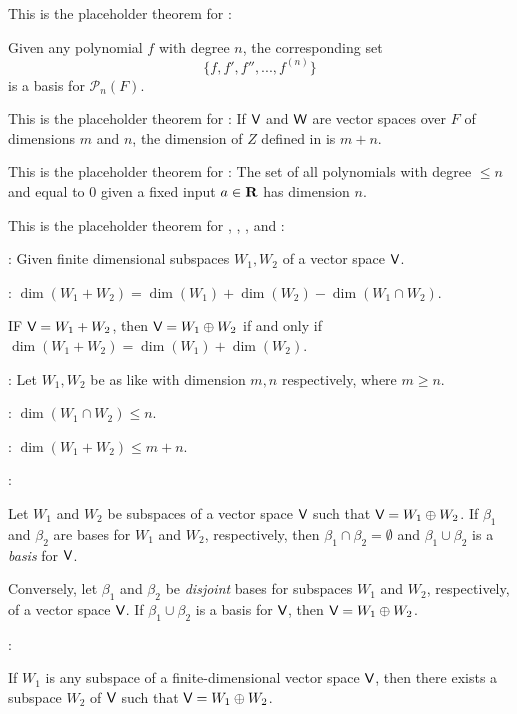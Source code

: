 \begin{additional theorem} \label{athm 1.24}
This is the placeholder theorem for :

Given any polynomial \(f\) with degree \(n\), the corresponding set
\[
    \{ f, f', f'', ..., f^{(n)} \}
\]
is a basis for \(\mathcal{P}_n(F)\).
\end{additional theorem}

\begin{additional theorem} \label{athm 1.25}
This is the placeholder theorem for :
If \(\textsf{V}\) and \(\textsf{W}\) are vector spaces over \(F\) of dimensions \(m\) and \(n\), the dimension of \(Z\) defined in  is \(m + n\).
\end{additional theorem}

\begin{additional theorem} \label{athm 1.26}
This is the placeholder theorem for :
The set of all polynomials with degree \(\le n\) and equal to \(0\) given a fixed input \(a \in \mathbf{R}\) has dimension \(n\).
\end{additional theorem}

\begin{additional theorem} \label{athm 1.27}
This is the placeholder theorem for , , , and :

: Given finite dimensional subspaces \(W_1, W_2\) of a vector space \(\textsf{V}\).

: \(\dim(W_1 + W_2) = \dim(W_1) + \dim(W_2) - \dim(W_1 \cap W_2)\).

 IF \(\textsf{V} = W_1 + W_2\), then \(\textsf{V} = W_1 \oplus W_2\) if and only if \(\dim(W_1 + W_2) = \dim(W_1) + \dim(W_2)\).

: Let \(W_1, W_2\) be as like  with dimension \(m, n\) respectively, where \(m \ge n\).

: \(\dim(W_1 \cap W_2) \le n\).

: \(\dim(W_1 + W_2) \le m + n\).

:

 Let \(W_1\) and \(W_2\) be subspaces of a vector space \(\textsf{V}\) such that \(\textsf{V} = W_1 \oplus W_2\).
If \(\beta_1\) and \(\beta_2\) are bases for \(W_1\) and \(W_2\), respectively, then \(\beta_1 \cap \beta_2 = \emptyset\) and \(\beta_1 \cup \beta_2\) is a \emph{basis} for \(\textsf{V}\).

 Conversely, let \(\beta_1\) and \(\beta_2\) be \emph{disjoint} bases for subspaces \(W_1\) and \(W_2\), respectively, of a vector space \(\textsf{V}\).
If \(\beta_1 \cup \beta_2\) is a basis for \(\textsf{V}\), then \(\textsf{V} = W_1 \oplus W_2\).
    
:

 If \(W_1\) is any subspace of a finite-dimensional vector space \(\textsf{V}\), then there exists a subspace \(W_2\) of \(\textsf{V}\) such that \(\textsf{V} = W_1 \oplus W_2\).
\end{additional theorem}

